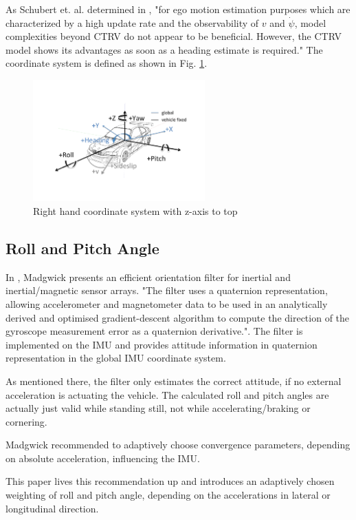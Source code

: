 \documentclass[a4paper,twoside]{article}
\begin{document}
As Schubert et. al. determined in \cite{Schubert2011}, "for ego motion estimation purposes which are characterized by a high update rate and the observability of $v$ and $\dot \psi$, model complexities beyond CTRV do not appear to be beneficial. However, the CTRV model shows its advantages as soon as a heading estimate is required."
The coordinate system is defined as shown in Fig.  \ref{KOS}.

\begin{figure}[ht]
\centering
\includegraphics[width=2.6in]{images/Koordinatensystem-DIN70000.pdf}
\caption{Right hand coordinate system with z-axis to top}
\label{KOS}
\end{figure}

\subsection{Roll and Pitch Angle}

In \cite{Madgwick2010}, Madgwick presents an efficient orientation filter for inertial and inertial/magnetic sensor arrays. "The filter uses a quaternion representation, allowing accelerometer and magnetometer data to be used in an analytically derived and optimised gradient-descent algorithm to compute the direction of the gyroscope measurement error as a quaternion derivative.". The filter is implemented on the IMU and provides attitude information in quaternion representation in the global IMU coordinate system.

As mentioned there, the filter only estimates the correct attitude, if no external acceleration is actuating the vehicle. The calculated roll and pitch angles are actually just valid while standing still, not while accelerating/braking or cornering.

Madgwick recommended to adaptively choose convergence parameters, depending on absolute acceleration, influencing the IMU.

This paper lives this recommendation up and introduces an adaptively chosen weighting of roll and pitch angle, depending on the accelerations in lateral or longitudinal direction.
\end{document}
